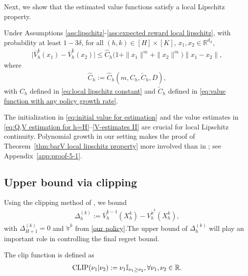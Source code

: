 \documentclass[final,supplement]{siamart251216}
\newcommand{\hCh}{\widehat{C}_h} %
\begin{document}
Next, we show that the estimated value functions satisfy a local Lipschitz property.



\begin{theorem}\label{thm:barV local lipschitz property}
   Under Assumptions \ref{ass:lipschitz}-\ref{ass:expected reward local lipschitz}, with probability at least $1-3\delta$, for all $(h,k) \in [H]\times [K]$, $x_1,x_2\in \mathbb{R}^{d_{\mathcal{S}}}$, 
    \begin{eqnarray*}
\Big|\overline{V}_{h}^{k}(x_1)-\overline{V}_{h}^{k}(x_2)\Big|\leq \hCh \Big(1+\|x_1\|^{m}+\|x_2\|^{m}\Big)\|x_1-x_2\|,
    \end{eqnarray*}
    where 
    \begin{eqnarray}\label{eq:C_hat}
        \hCh:=\hCh(m,C_h,\widetilde{C}_h, D),
    \end{eqnarray}
with $C_h$ defined in \eqref{eq:local lipschitz constant} and $\widetilde{C}_h$ defined in \eqref{eq:value function with any policy growth rate}. 
\end{theorem}


The initialization in \eqref{eq:initial value for estimation} and the value estimates in \eqref{eq:Q,V estimation for h=H}--\eqref{V-estimates II} are crucial for local Lipschitz continuity. Polynomial growth in our setting makes the proof of Theorem~\ref{thm:barV local lipschitz property} more involved than in \cite{sinclair2023adaptive}; see Appendix~\ref{app:proof-5-1}.


\subsection{Upper bound via clipping}
Using the clipping method of \cite[Section E]{sinclair2023adaptive}, we bound
\begin{eqnarray}\label{eq:delta-hk}
    \Delta_{h}^{(k)}:=\overline{V}_h^{k-1}(X_h^k)-V_h^{\tilde{\pi}^{k}}(X_h^k),
\end{eqnarray}
with $\Delta_{H+1}^{(k)}=0$ and $\tilde\pi^k$ from \eqref{our policy}.The upper bound of $\Delta_{h}^{(k)}$ will play an important role in controlling the final regret bound.


The clip function is defined as
\begin{eqnarray}\label{eq:clip}
       {\rm CLIP}(\nu_{1}|\nu_{2}):=\nu_{1}\mathbb{I}_{\nu_{1}\geq \nu_{2}}, \forall \nu_{1},\nu_{2} \in \mathbb{R}.
\end{eqnarray}
\end{document}
